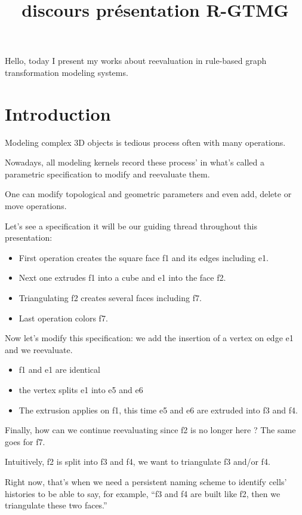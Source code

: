\documentclass[11pt]{article}
\date{}
\title{discours présentation R-GTMG}
\begin{document}
\maketitle

Hello, today I present my works about reevaluation in rule-based graph
transformation modeling systems.

\section{Introduction}
\label{sec:orgded3f04}

Modeling complex 3D objects is tedious process often with many operations.

Nowadays, all modeling kernels record these process' in what's called a
parametric specification to modify and reevaluate them.

One can modify topological and geometric parameters and even add, delete or move
operations.

Let's see a specification it will be our guiding thread throughout this presentation:
\begin{itemize}
	\item First operation creates the square face f1 and its edges including e1.
	\item Next one extrudes f1 into a cube and e1 into the face f2.
	\item Triangulating f2 creates several faces including f7.
	\item Last operation colors f7.
\end{itemize}

Now let's modify this specification: we add the insertion of a vertex on edge e1
and we reevaluate.

\begin{itemize}
	\item f1 and e1 are identical
	\item the vertex splits e1 into e5 and e6
	\item The extrusion applies on f1, this time e5 and e6 are extruded into f3
	      and f4.
\end{itemize}

Finally, how can we continue reevaluating since f2 is no longer here ? The same goes
for f7.

Intuitively, f2 is split into f3 and f4, we want to triangulate f3 and/or f4.

Right now, that's when we need a persistent naming scheme to identify cells'
histories to be able to say, for example, ``f3 and f4 are built like f2,
then we triangulate these two faces.''
\end{document}
